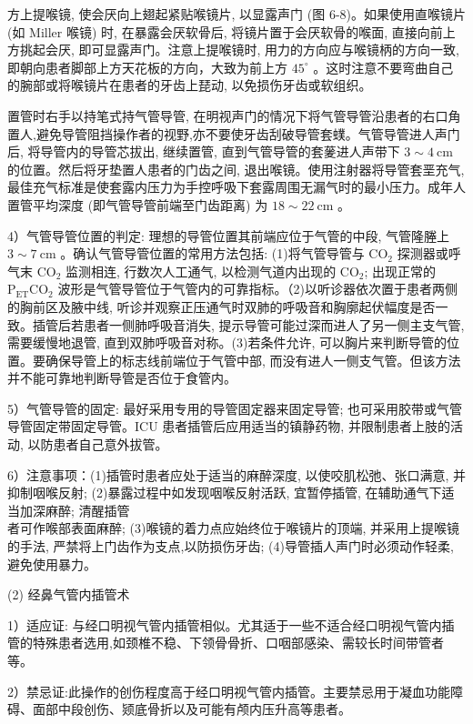 \documentclass[10pt]{article}
\begin{document}
方上提喉镜, 使会厌向上翅起紧贴喉镜片, 以显露声门 (图 6-8)。如果使用直喉镜片 (如 Miller 喉镜) 时, 在暴露会厌软骨后, 将镜片置于会厌软骨的喉面, 直接向前上方挑起会厌, 即可显露声门。注意上提喉镜时, 用力的方向应与喉镜柄的方向一致,即朝向患者脚部上方天花板的方向，大致为前上方 $45^{\circ}$ 。这时注意不要弯曲自己的腕部或将喉镜片在患者的牙齿上琵动, 以免损伤牙齿或软组织。

置管时右手以持笔式持气管导管, 在明视声门的情况下将气管导管沿患者的右口角置人,避免导管阻挡操作者的视野,亦不要使牙齿刮破导管套䗱。气管导管进人声门后, 将导管内的导管芯拔出, 继续置管, 直到气管导管的套蓌进人声带下 $3 \sim 4 \mathrm{~cm}$ 的位置。然后将牙垫置人患者的门齿之间, 退出喉镜。使用注射器将导管套垩充气, 最佳充气标准是使套露内压力为手控呼吸下套露周围无漏气时的最小压力。成年人置管平均深度 (即气管导管前端至门齿距离) 为 $18 \sim 22 \mathrm{~cm}$ 。

4）气管导管位置的判定: 理想的导管位置其前端应位于气管的中段, 气管隆塍上 $3 \sim 7 \mathrm{~cm}$ 。确认气管导管位置的常用方法包括: (1)将气管导管与 $\mathrm{CO}_{2}$ 探测器或呼气末 $\mathrm{CO}_{2}$ 监测相连, 行数次人工通气, 以检测气道内出现的 $\mathrm{CO}_{2}$; 出现正常的 $\mathrm{P}_{\mathrm{ET}} \mathrm{CO}_{2}$ 波形是气管导管位于气管内的可靠指标。（2)以听诊器依次置于患者两侧的胸前区及腋中线, 听诊并观察正压通气时双肺的呼吸音和胸廓起伏幅度是否一致。插管后若患者一侧肺呼吸音消失, 提示导管可能过深而进人了另一侧主支气管, 需要缓慢地退管, 直到双肺呼吸音对称。(3)若条件允许, 可以胸片来判断导管的位置。要确保导管上的标志线前端位于气管中部, 而没有进人一侧支气管。但该方法并不能可靠地判断导管是否位于食管内。

5）气管导管的固定: 最好采用专用的导管固定器来固定导管; 也可采用胶带或气管导管固定带固定导管。ICU 患者插管后应用适当的镇静药物, 并限制患者上肢的活动, 以防患者自己意外拔管。

6）注意事项：(1)插管时患者应处于适当的麻醉深度, 以使咬肌松弛、张口满意, 并抑制咽喉反射; (2)暴露过程中如发现咽喉反射活跃, 宜暂停插管, 在辅助通气下适当加深麻醉; 清醒插管\\
者可作喉部表面麻醉; (3)喉镜的着力点应始终位于喉镜片的顶端, 并采用上提喉镜的手法, 严禁将上门齿作为支点,以防损伤牙齿; (4)导管插人声门时必须动作轻柔, 避免使用暴力。

(2) 经鼻气管内插管术

1）适应证: 与经口明视气管内插管相似。尤其适于一些不适合经口明视气管内插管的特殊患者选用,如颈椎不稳、下领骨骨折、口咽部感染、需较长时间带管者等。

2）禁忌证:此操作的创伤程度高于经口明视气管内插管。主要禁忌用于凝血功能障碍、面部中段创伤、颎底骨折以及可能有颅内压升高等患者。
\end{document}
